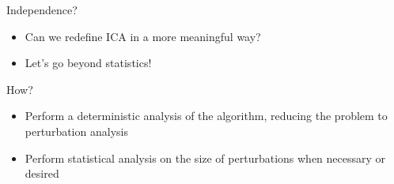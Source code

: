 \documentclass[final]{beamer} %
\begin{document}
\begin{frame}[c]
\begin{columns}[t,totalwidth=\textwidth]
\begin{column}{.32\textwidth}
\begin{block}{Independence?}
\begin{itemize}
			\item Can we redefine ICA in a more meaningful way?
			\item \alert{Let's go beyond statistics!}
			\end{itemize}
			\centering \vspace{0.5ex}
				{\large How? }
				\vspace{0.5ex}
			\begin{itemize}
				\item Perform a deterministic analysis of the algorithm, reducing the problem to perturbation analysis
				\item Perform statistical analysis on the size of perturbations when necessary or desired
			\end{itemize}
		\end{block}


	\end{column}
	\begin{column}{0.01\textwidth}
	\end{column}
	

\end{columns}
\end{frame}
\end{document}

